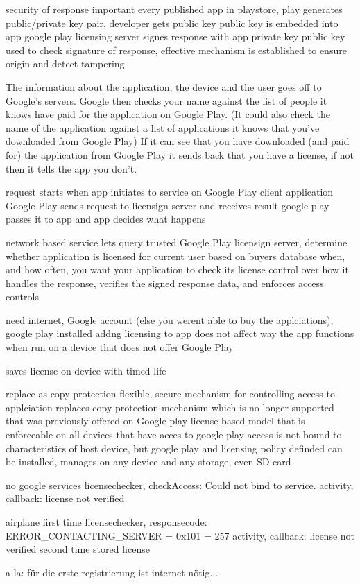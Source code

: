 security of response important
every published app in playstore, play generates public/private key pair, developer gets public key
public key is embedded into app
google play licensing server signes response with app private key
public key used to check signature of response, effective mechanism is established to ensure origin and detect tampering
\cite{munteanLicense}
%

The information about the application, the device and the user goes off to Google's servers.
Google then checks your name against the list of people it knows have paid for the application on Google Play. (It could also check the name of the application against a list of applications it knows that you've downloaded from Google Play)
If it can see that you have downloaded (and paid for) the application from Google Play it sends back that you have a license, if not then it tells the app you don't.

%
request starts when app initiates to service on Google Play client application
Google Play sends request to licensign server and receives result
google play passes it to app and app decides what happens
\cite{developersLicensingOverview}
%


%
network based service lets query trusted Google Play licensign server, determine whether application is licensed for current user based on buyers database
when, and how often, you want your application to check its license
control over how it handles the response, verifies the signed response data, and enforces access controls

need internet, Google account (else you werent able to buy the applciations), google play installed
addng licensing to app does not affect way the app functions when run on a device that does not offer Google Play

saves license on device with timed life

replace as copy protection
flexible, secure mechanism for controlling access to applciation
replaces copy protection mechanism which is no longer supported that was previously offered on Google play
license based model that is enforceable on all devices that have acces to google play
access is not bound to characteristics of host device, but google play and licensing policy definded
can be installed, manages on any device and any storage, even SD card
\cite{developersLicensingOverview}
%


no google services
licensechecker, checkAccess: Could not bind to service.
activity, callback: license not verified

airplane
first time
licensechecker, responsecode: ERROR\_CONTACTING\_SERVER = 0x101 = 257
activity, callback: license not verified
second time
stored license\cite{developersLicensingAdding}

a la: für die erste registrierung ist internet nötig...
